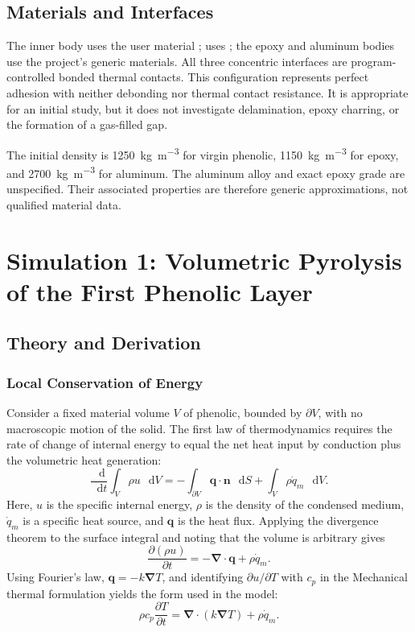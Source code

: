 \documentclass[oneside,openany]{amsdtx}
\newcommand{\dd}{\mathop{}\!\mathrm{d}}
\newcommand{\pd}{\partial}
\newcommand{\vect}[1]{\bm{#1}}
\begin{document}
\subsection{Materials and Interfaces}

The inner body  uses the user material
;  uses ; the epoxy
and aluminum bodies use the project's generic materials. All three concentric
interfaces are program-controlled bonded thermal contacts. This configuration
represents perfect adhesion with neither debonding nor thermal contact
resistance. It is appropriate for an initial study, but it does not investigate
delamination, epoxy charring, or the formation of a gas-filled gap.

The initial density is \SI{1250}{kg.m^{-3}} for virgin phenolic,
\SI{1150}{kg.m^{-3}} for epoxy, and \SI{2700}{kg.m^{-3}} for aluminum. The
aluminum alloy and exact epoxy grade are unspecified. Their associated
properties are therefore generic approximations, not qualified material data.

\clearpage
\section{Simulation 1: Volumetric Pyrolysis of the First Phenolic Layer}

\subsection{Theory and Derivation}

\subsubsection{Local Conservation of Energy}

Consider a fixed material volume \(V\) of phenolic, bounded by
\(\partial V\), with no macroscopic motion of the solid. The first law of
thermodynamics requires the rate of change of internal energy to equal the net
heat input by conduction plus the volumetric heat generation:
\begin{equation}
  \frac{\dd}{\dd t}\int_V \rho u\,\dd V
  =-\int_{\partial V}\vect q\cdot\vect n\,\dd S
   +\int_V \rho\dot q_m\,\dd V .
  \label{eq:first-law-integral}
\end{equation}
Here, \(u\) is the specific internal energy, \(\rho\) is the density of the
condensed medium, \(\dot q_m\) is a specific heat source, and \(\vect q\) is
the heat flux. Applying the divergence theorem to the surface integral and
noting that the volume is arbitrary gives
\begin{equation}
  \frac{\pd(\rho u)}{\pd t}=-\vect\nabla\cdot\vect q+\rho\dot q_m .
\end{equation}
Using Fourier's law, \(\vect q=-k\vect\nabla T\), and identifying
\(\pd u/\pd T\) with \(c_p\) in the Mechanical thermal formulation yields the
form used in the model:
\begin{equation}
  \rho c_p\frac{\pd T}{\pd t}
  =\vect\nabla\cdot\left(k\vect\nabla T\right)+\rho\dot q_m .
  \label{eq:heat-general}
\end{equation}
\end{document}
